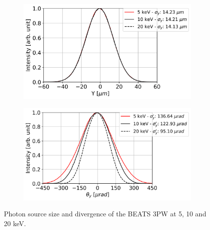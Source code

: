 \begin{figure}[ht]
\bigskip  %
\begin{subfigure}{0.5\textwidth}
\includegraphics[width=\linewidth]{./../../beam_snapshots/3PW/sigmaY.png}
\end{subfigure}
\hfill %
\begin{subfigure}{0.5\textwidth}
\includegraphics[width=\linewidth]{./../../beam_snapshots/3PW/sigmaYp.png}
\end{subfigure}

\caption{\label{fig:3PW_source} Photon source size and divergence of the BEATS 3PW at 5, 10 and 20 keV.}
\end{figure}

